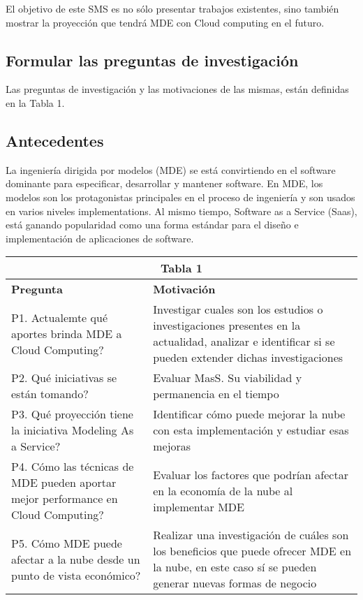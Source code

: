 \documentclass{llncs}
\begin{document}
El objetivo de este SMS es no sólo presentar trabajos existentes, sino también mostrar la proyección que tendrá MDE con Cloud computing
en el futuro.

\subsection{Formular las preguntas de investigación}
Las preguntas de investigación y las motivaciones de las mismas, están definidas en la Tabla 1.

\subsection{Antecedentes}
La ingeniería dirigida por modelos (MDE) se está convirtiendo en el software dominante para especificar,
desarrollar y mantener software. En MDE, los modelos son los protagonistas principales en el proceso
de ingeniería y son usados en varios niveles implementations.
Al mismo tiempo, Software as a Service (Saas), está ganando popularidad como una forma estándar para el diseño
e implementación de aplicaciones de software.



\begin{tabular}{  | p{5cm} | p{7cm}  | }
  \hline
  \multicolumn{2}{|c|}{\bf Tabla 1} \\
  \hline
  \bf Pregunta & \bf Motivación \\
  \hline
  P1. Actualemte qué aportes brinda MDE a Cloud Computing?  & Investigar cuales son los estudios o investigaciones presentes en la actualidad, analizar e identificar si se pueden extender dichas investigaciones\\
  \hline
  P2. Qué iniciativas se están tomando? & Evaluar MasS. Su viabilidad y permanencia en el tiempo\\
  \hline
  P3. Qué proyección tiene la iniciativa Modeling As a Service? & Identificar cómo puede mejorar la nube con esta implementación y estudiar esas mejoras\\
  \hline
  P4. Cómo las técnicas de MDE pueden aportar mejor performance en Cloud Computing?  & Evaluar los factores que podrían afectar en la economía de la nube al implementar MDE\\
  \hline
  P5. Cómo MDE puede afectar a la nube desde un punto de vista económico? & Realizar una investigación de cuáles son los beneficios que puede ofrecer MDE en la nube, en este caso sí se pueden generar nuevas formas de negocio\\
  \hline
\end{tabular}
\end{document}

